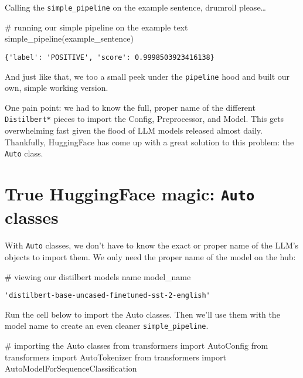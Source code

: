 \documentclass[
  letterpaper,
  DIV=11,
  numbers=noendperiod]{scrartcl}
\newenvironment{Shaded}{\begin{snugshade}}{\end{snugshade}}
\newcommand{\CommentTok}[1]{\textcolor[rgb]{0.37,0.37,0.37}{#1}}
\newcommand{\ImportTok}[1]{\textcolor[rgb]{0.00,0.46,0.62}{#1}}
\newcommand{\NormalTok}[1]{\textcolor[rgb]{0.00,0.23,0.31}{#1}}
\begin{document}
Calling the \texttt{simple\_pipeline} on the example sentence, drumroll
please\ldots{}

\begin{Shaded}
\begin{Highlighting}[]
\CommentTok{\# running our simple pipeline on the example text}
\NormalTok{simple\_pipeline(example\_sentence)}
\end{Highlighting}
\end{Shaded}

\begin{verbatim}
{'label': 'POSITIVE', 'score': 0.9998503923416138}
\end{verbatim}

And just like that, we too a small peek under the \texttt{pipeline} hood
and built our own, simple working version.

One pain point: we had to know the full, proper name of the different
\texttt{Distilbert*} pieces to import the Config, Preprocessor, and
Model. This gets overwhelming fast given the flood of LLM models
released almost daily. Thankfully, HuggingFace has come up with a great
solution to this problem: the \texttt{Auto} class.

\section{\texorpdfstring{True HuggingFace magic: \texttt{Auto}
classes}{True HuggingFace magic: Auto classes}}\label{true-huggingface-magic-auto-classes}

With \texttt{Auto} classes, we don't have to know the exact or proper
name of the LLM's objects to import them. We only need the proper name
of the model on the hub:

\begin{Shaded}
\begin{Highlighting}[]
\CommentTok{\# viewing our distilbert model\textquotesingle{}s name}
\NormalTok{model\_name}
\end{Highlighting}
\end{Shaded}

\begin{verbatim}
'distilbert-base-uncased-finetuned-sst-2-english'
\end{verbatim}

Run the cell below to import the Auto classes. Then we'll use them with
the model name to create an even cleaner \texttt{simple\_pipeline}.

\begin{Shaded}
\begin{Highlighting}[]
\CommentTok{\# importing the Auto classes}
\ImportTok{from}\NormalTok{ transformers }\ImportTok{import}\NormalTok{ AutoConfig}
\ImportTok{from}\NormalTok{ transformers }\ImportTok{import}\NormalTok{ AutoTokenizer}
\ImportTok{from}\NormalTok{ transformers }\ImportTok{import}\NormalTok{ AutoModelForSequenceClassification}
\end{Highlighting}
\end{Shaded}
\end{document}
